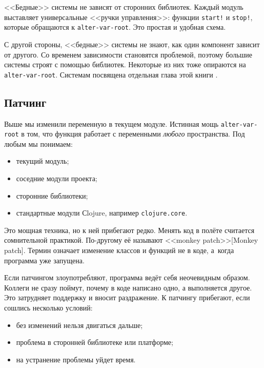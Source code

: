 
<<Бедные>> системы не зависят от сторонних библиотек. Каждый модуль выставляет
универсальные <<ручки управления>>: функции \verb|start!| и \verb|stop!|,
которые обращаются к \verb|alter-var-root|. Это простая и удобная схема.

С другой стороны, <<бедные>> системы не знают, как один компонент зависит от
другого. Со временем зависимости становятся проблемой, поэтому большие системы
строят с помощью библиотек. Некоторые из них тоже опираются на
\verb|alter-var-root|. Системам посвящена отдельная глава этой
книги .

\subsection{Патчинг}


Выше мы изменили переменную в текущем модуле. Истинная мощь
\verb|alter-var-root| в том, что функция работает с переменными \emph{любого}
пространства. Под любым мы понимаем:

\begin{itemize}

\item
  текущий модуль;

\item
  соседние модули проекта;

\item
  сторонние библиотеки;

\item
  стандартные модули Сlojure, например \verb|clojure.core|.

\end{itemize}


Это мощная техника, но к ней прибегают редко. Менять код в полёте считается
сомнительной практикой. По-другому её называют <<monkey
patch>>[Monkey patch]. Термин означает
изменение классов и функций не в коде, а~когда программа уже запущена.

Если патчингом злоупотребляют, программа ведёт себя неочевидным
образом. Коллеги не сразу поймут, почему в коде написано одно, а выполняется
другое. Это затрудняет поддержку и вносит раздражение. К патчингу прибегают,
если сошлись несколько условий:

\begin{itemize}

\item
  без изменений нельзя двигаться дальше;

\item
  проблема в сторонней библиотеке или платформе;

\item
  на устранение проблемы уйдет время.

\end{itemize}

